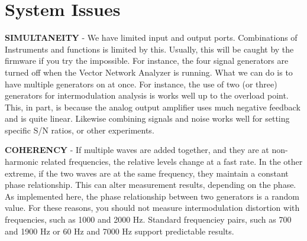 \section{System Issues}

\textbf{SIMULTANEITY} - We have limited input and output ports.  Combinations of Instruments and functions is limited by this.  Usually, this will be caught by the firmware if you try the impossible.  For instance, the four signal generators are turned off when the Vector Network Analyzer is running.  What we can do is to have multiple generators on at once.  For instance, the use of two (or three) generators for intermodulation analysis is works well up to the overload point.  This, in part, is because the analog output amplifier uses much negative feedback and is quite linear.  Likewise combining signals and noise works well for setting specific S/N ratios, or other experiments.

\textbf{COHERENCY} - If multiple waves are added together, and they are at non-harmonic related frequencies, the relative levels change at a fast rate.  In the other extreme, if the two
waves are at the same frequency, they maintain a constant phase relationship. This can alter measurement results, depending on the phase. As implemented here, the phase relationship between two generators is a random  value.  For these reasons, you should not measure intermodulation distortion with frequencies, such as 1000 and 2000 Hz.  Standard frequenciey pairs, such as 700 and 1900 Hz or 60 Hz and 7000 Hz support predictable results.